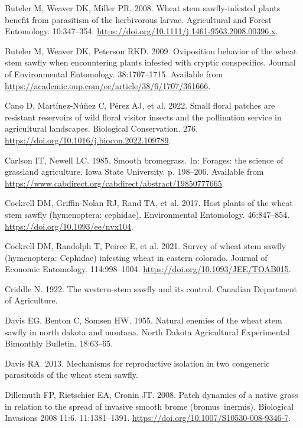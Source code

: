 \documentclass[
]{article}
\newlength{\cslhangindent}
\newenvironment{CSLReferences}[2] %
 {\begin{list}{}{%
  \setlength{\itemindent}{0pt}
  \setlength{\leftmargin}{0pt}
  \setlength{\parsep}{0pt}
  \ifodd #1
   \setlength{\leftmargin}{\cslhangindent}
   \setlength{\itemindent}{-1\cslhangindent}
  \fi
  \setlength{\itemsep}{#2\baselineskip}}}
 {\end{list}}
\begin{document}
\begin{CSLReferences}{0}{1}
Buteler M, Weaver DK, Miller PR. 2008. Wheat stem sawfly-infested plants
benefit from parasitism of the herbivorous larvae. Agricultural and
Forest Entomology. 10:347--354.
\url{https://doi.org/10.1111/j.1461-9563.2008.00396.x}.

Buteler M, Weaver DK, Peterson RKD. 2009. Oviposition behavior of the
wheat stem sawfly when encountering plants infested with cryptic
conspecifics. Journal of Environmental Entomology. 38:1707--1715.
Available from
\url{https://academic.oup.com/ee/article/38/6/1707/361666}.

Cano D, Martínez-Núñez C, Pérez AJ, et al. 2022. Small floral patches
are resistant reservoirs of wild floral visitor insects and the
pollination service in agricultural landscapes. Biological Conservation.
276. \url{https://doi.org/10.1016/j.biocon.2022.109789}.

Carlson IT, Newell LC. 1985. Smooth bromegrass. In: Forages: the science
of grassland agriculture. Iowa State University. p. 198--206. Available
from \url{https://www.cabdirect.org/cabdirect/abstract/19850777665}.

Cockrell DM, Griffin-Nolan RJ, Rand TA, et al. 2017. Host plants of the
wheat stem sawfly (hymenoptera: cephidae). Environmental Entomology.
46:847--854. \url{https://doi.org/10.1093/ee/nvx104}.

Cockrell DM, Randolph T, Peirce E, et al. 2021. Survey of wheat stem
sawfly (hymenoptera: Cephidae) infesting wheat in eastern colorado.
Journal of Economic Entomology. 114:998--1004.
\url{https://doi.org/10.1093/JEE/TOAB015}.

Criddle N. 1922. The western-stem sawfly and its control. Canadian
Department of Agriculture.

Davis EG, Benton C, Somsen HW. 1955. Natural enemies of the wheat stem
sawfly in north dakota and montana. North Dakota Agricultural
Experimental Bimonthly Bulletin. 18:63--65.

Davis RA. 2013. Mechanisms for reproductive isolation in two congeneric
parasitoids of the wheat stem sawfly.

Dillemuth FP, Rietschier EA, Cronin JT. 2008. Patch dynamics of a native
grass in relation to the spread of invasive smooth brome
(bromus~inermis). Biological Invasions 2008 11:6. 11:1381--1391.
\url{https://doi.org/10.1007/S10530-008-9346-7}.


\end{CSLReferences}
\end{document}

